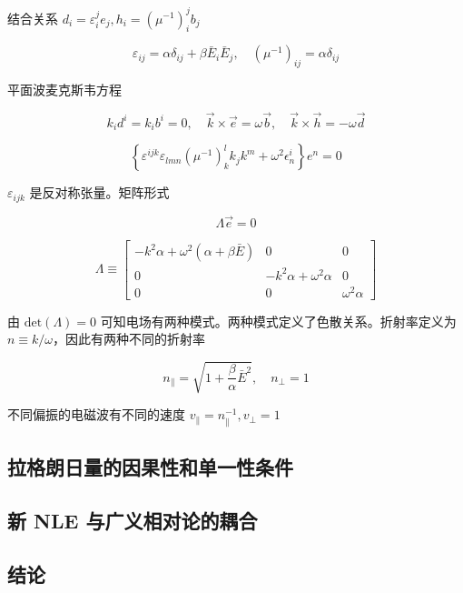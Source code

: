 \documentclass[9pt, dvipsnames]{beamer} %
\begin{document}
\begin{frame}    
    结合关系 $d_i=\varepsilon_i^j e_j,h_i=\left(\mu^{-1} \right)_i^j b_j $
    
    $$
    \varepsilon_{ij} = \alpha\delta_{ij} + \beta\bar{E}_i\bar{E}_j ,\quad
    \left(\mu^{-1} \right)_{ij} = \alpha\delta_{ij} 
    $$
    
    平面波麦克斯韦方程
    
    $$
    k_i d^i = k_i b^i = 0,\quad
    \vec{k}\times\vec{e} = \omega\vec{b},\quad
    \vec{k}\times\vec{h} = -\omega\vec{d} 
    $$
    
    
    $$
    \left\{\varepsilon^{ijk}\varepsilon_{lmn} \left(\mu^{-1} \right)_k^l k_j k^m+\omega^2\epsilon_n^i \right\}e^n = 0
    $$
    
    $\varepsilon_{ijk} $ 是反对称张量。矩阵形式
    
    $$
    \Lambda \vec{e} = 0 
    $$
    
    $$
    \Lambda
    \equiv \begin{bmatrix}
    -k^2 \alpha+\omega^2\left(\alpha+\beta\bar{E} \right) &0 &0 \\
    0 &-k^2\alpha+\omega^2\alpha &0 \\
    0 &0 &\omega^2\alpha
    \end{bmatrix} 
    $$
    
    由 $\mathrm{det}(\Lambda)=0 $ 可知电场有两种模式。两种模式定义了色散关系。折射率定义为 $n\equiv k/\omega $，因此有两种不同的折射率
    
    $$
    n_\parallel = \sqrt{1+\frac{\beta }{\alpha } \bar{E}^2},\quad
    n_\perp = 1 
    $$
    
    不同偏振的电磁波有不同的速度 $v_\parallel=n_\parallel^{-1},v_\perp=1 $
\end{frame}

\subsection{拉格朗日量的因果性和单一性条件}

\subsection{新 NLE 与广义相对论的耦合}

\subsection{结论}

\begin{frame}
    \frametitle{\textbf{}}

\end{frame}
\end{document}
